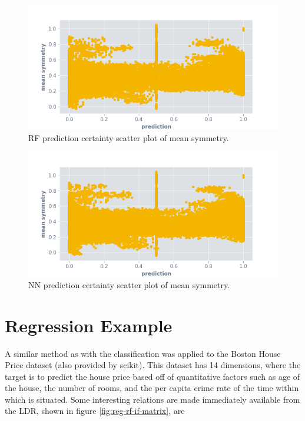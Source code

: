 \documentclass[a4paper, twocolumn]{article}
\begin{document}
\begin{figure}
\centering
\includegraphics[width=0.7\columnwidth]{img/rf_if_mean_symmetry.png}
\caption{RF prediction certainty scatter plot of mean symmetry.}
\label{fig:rf-if-mean-symmetry-scatter}
\end{figure}

\begin{figure}
\centering
\includegraphics[width=0.7\columnwidth]{img/nn_if_mean_symmetry.png}
\caption{NN prediction certainty scatter plot of mean symmetry.}
\label{fig:nn-if-mean-symmetry-scatter}
\end{figure}

\section{Regression Example}

A similar method as with the classification was applied to the Boston House Price dataset \cite{bostonhouse} (also provided by scikit). This dataset has 14 dimensions, where the target is to predict the house price based off of quantitative factors such as age of the house, the number of rooms, and the per capita crime rate of the time within which is situated. Some interesting relations are made immediately available from the LDR, shown in figure \ref{fig:reg-rf-if-matrix}, are
\end{document}
